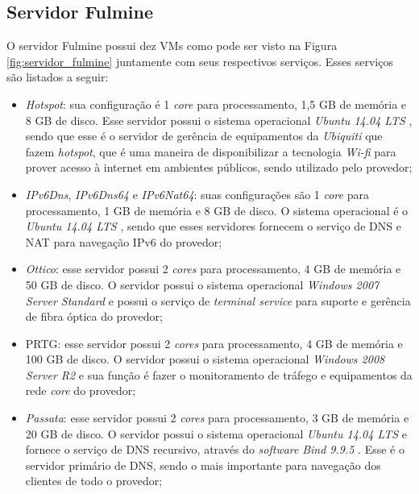 \subsection{Servidor Fulmine}
\label{section:serv_fulmine}

O servidor Fulmine possui dez \ac{VM}s como pode ser visto na Figura \ref{fig:servidor_fulmine} juntamente com seus respectivos serviços. 
Esses serviços são listados a seguir:
\begin{itemize}
 \item \textit{Hotspot}: sua configuração é 1 \textit{core} para processamento, 1,5 GB de memória e 8 GB de disco. Esse servidor possui o 
 sistema operacional \textit{Ubuntu 14.04 \ac{LTS}} \cite{ubuntu}, sendo que esse é o servidor de gerência de equipamentos da \textit{Ubiquiti} 
 que fazem \textit{hotspot}, que é uma maneira de disponibilizar a tecnologia \textit{Wi-fi} para prover acesso à internet em ambientes públicos, 
 sendo utilizado pelo provedor;
 
 \item \textit{IPv6Dns}, \textit{IPv6Dns64} e \textit{IPv6Nat64}: suas configurações são 1 \textit{core} para processamento, 1 GB de memória e 
 8 GB de disco. O sistema operacional é o \textit{Ubuntu 14.04 \ac{LTS}} \cite{ubuntu}, sendo que esses servidores fornecem o serviço de \ac{DNS} 
 e \ac{NAT} para navegação \ac{IPv6} do provedor;
 
 \item \textit{Ottico}: esse servidor possui 2 \textit{cores} para processamento, 4 GB de memória e 50 GB de disco. O servidor possui o sistema 
 operacional \textit{Windows 2007 Server Standard} e possui o serviço de \textit{terminal service} para suporte e gerência de fibra óptica do 
 provedor;
 
 \item \ac{PRTG}: esse servidor possui 2 \textit{cores} para processamento, 4 GB de memória e 100 GB de disco. O servidor possui o sistema 
 operacional \textit{Windows 2008 Server R2} e sua função é fazer o monitoramento de tráfego e equipamentos da rede \textit{core} do provedor;
 
 \item \textit{Passata}: esse servidor possui 2 \textit{cores} para processamento, 3 GB de memória e 20 GB de disco. O servidor possui o 
 sistema operacional \textit{Ubuntu 14.04 \ac{LTS}} \cite{ubuntu} e fornece o serviço de \ac{DNS} recursivo, através do \textit{software} 
 \textit{Bind 9.9.5} \cite{bind}. Esse é o servidor primário de \ac{DNS}, sendo o mais importante para navegação dos clientes de todo o provedor;
 

\end{itemize}
